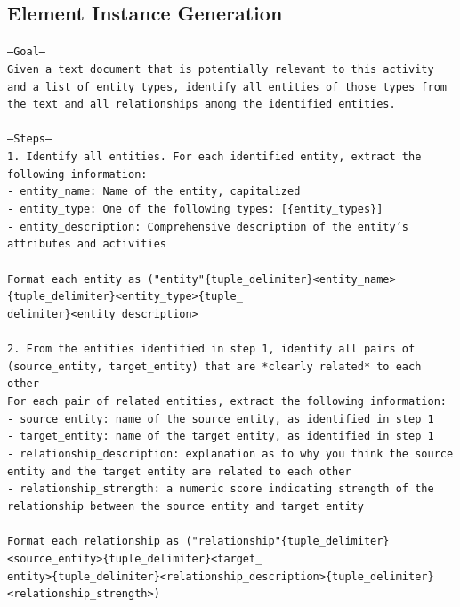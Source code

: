 
\subsection{Element Instance Generation}

\scriptsize
\texttt{---Goal---\\
Given a text document that is potentially relevant to this activity and a list of entity types, identify all entities of those types from the text and all relationships among the identified entities.\\
\\
---Steps---\\
1. Identify all entities. For each identified entity, extract the following information:\\
- entity\_name: Name of the entity, capitalized\\
- entity\_type: One of the following types: [\{entity\_types\}]\\
- entity\_description: Comprehensive description of the entity's attributes and activities\\
\\
Format each entity as ("entity"\{tuple\_delimiter\}<entity\_name>\{tuple\_delimiter\}<entity\_type>\{tuple\_\\
delimiter\}<entity\_description>\\
\\
2. From the entities identified in step 1, identify all pairs of (source\_entity, target\_entity) that are *clearly related* to each other\\
For each pair of related entities, extract the following information:\\
- source\_entity: name of the source entity, as identified in step 1\\
- target\_entity: name of the target entity, as identified in step 1\\
- relationship\_description: explanation as to why you think the source entity and the target entity are related to each other\\
- relationship\_strength: a numeric score indicating strength of the relationship between the source entity and target entity\\
\\
Format each relationship as ("relationship"\{tuple\_delimiter\}<source\_entity>\{tuple\_delimiter\}<target\_\\
entity>\{tuple\_delimiter\}<relationship\_description>\{tuple\_delimiter\}<relationship\_strength>)\\
}
